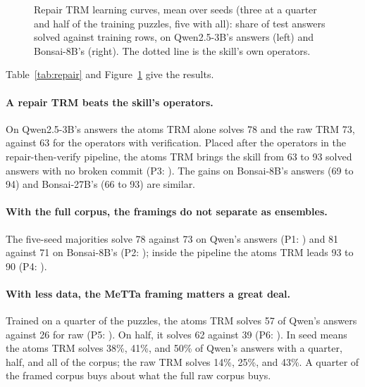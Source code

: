 \documentclass[11pt]{article}
\begin{document}
\begin{figure}[t]
  \centering
  \hfill
  
  \caption{Repair TRM learning curves, mean over seeds (three at a quarter and half of the training puzzles, five with all): share of test answers solved against training rows, on Qwen2.5-3B's answers (left) and Bonsai-8B's (right). The dotted line is the skill's own operators.}
  \label{fig:repair-curves}
\end{figure}

Table~\ref{tab:repair} and Figure~\ref{fig:repair-curves} give the results.

\paragraph{A repair TRM beats the skill's operators.} On Qwen2.5-3B's answers the atoms TRM alone solves 78 and the raw TRM 73, against 63 for the operators with verification. Placed after the operators in the repair-then-verify pipeline, the atoms TRM brings the skill from 63 to 93 solved answers with no broken commit (P3: \testPthree). The gains on Bonsai-8B's answers (69 to 94) and Bonsai-27B's (66 to 93) are similar.

\paragraph{With the full corpus, the framings do not separate as ensembles.} The five-seed majorities solve 78 against 73 on Qwen's answers (P1: \testPone) and 81 against 71 on Bonsai-8B's (P2: \testPtwo); inside the pipeline the atoms TRM leads 93 to 90 (P4: \testPfour).

\paragraph{With less data, the MeTTa framing matters a great deal.} Trained on a quarter of the puzzles, the atoms TRM solves 57 of Qwen's answers against 26 for raw (P5: \testPfive). On half, it solves 62 against 39 (P6: \testPsix). In seed means the atoms TRM solves 38\%, 41\%, and 50\% of Qwen's answers with a quarter, half, and all of the corpus; the raw TRM solves 14\%, 25\%, and 43\%. A quarter of the framed corpus buys about what the full raw corpus buys.
\end{document}
